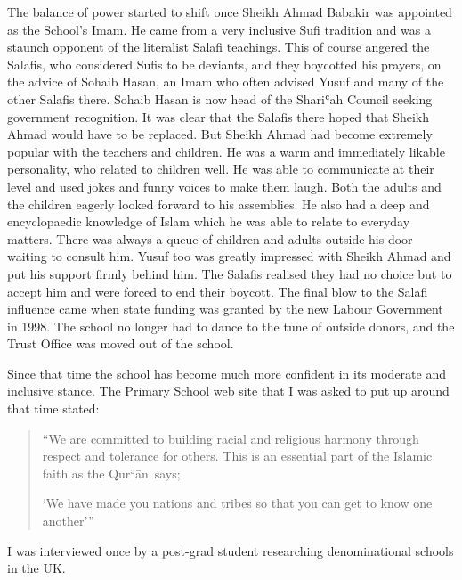 \documentclass[12pt]{memoir}
\def\´{ʾ} %
\def\`{ʿ} %
\newcommand{\cor}[2]{#2} %
\def \Quran{Qur\-\´ān} %
\begin{document}
The balance of power started to shift once Sheikh Ahmad Babakir
was appointed as the School’s Imam.
He came from a very inclusive Sufi tradition
and was a staunch opponent of the literalist Salafi teachings.
This of course angered the Salafis, who considered Sufis to be deviants,
and they boycotted his prayers, on the advice of Sohaib Hasan,
an Imam who often advised Yusuf and many of the other Salafis there.
Sohaib Hasan is now head of the Shari\`ah Council
seeking government recognition.
It was clear that the Salafis there hoped
that Sheikh \cor{Ahamd}{Ahmad} would have to be replaced.
But Sheikh Ahmad had become \cor{became }{}extremely popular
with the teachers and children.
He was a warm and immediately likable personality,
who related to children well.
He was able to communicate at their level
and used jokes and funny voices to make them laugh.
Both the adults and the children eagerly looked forward to his assemblies.
He also had a deep and encyclopaedic knowledge of Islam
which he was able to relate to everyday matters.
There was always a queue of children
and adults outside his door waiting to consult him.
Yusuf too was greatly impressed with Sheikh Ahmad
and put his support firmly behind him.
The Salafis realised they had no choice
but to accept him and were forced to end their boycott.
The final blow to the Salafi influence came
when state funding was granted by the new Labour Government in 1998.
The school no longer had to dance to the tune of outside donors,
and the Trust Office was moved out of the school.

Since that time the school has become much more confident
in its moderate and inclusive stance.
The Primary School web site that I was asked to put up around that time stated:

\begin{quote}
“We are committed to building racial and religious harmony
through respect and tolerance for others.
This is an essential part of the Islamic faith as the \Quran\ says;

‘We have made you nations and tribes so that you can get to know one another’”
\end{quote}

I was interviewed once by a post-grad student
researching denominational schools in the UK.
\end{document}
